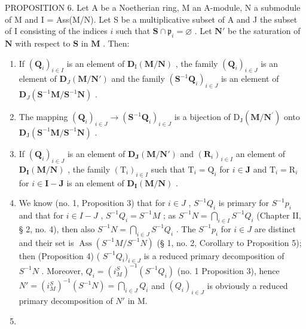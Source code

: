 PROPOSITION 6. Let A be a Noetherian ring, M an A-module, N a submodule of M and I = Ass(M/N). Let S be a multiplicative subset of A and J the subset of I consisting of the indices \(i\) such that \(\mathbf{S} \cap \mathfrak{p}_i = \varnothing\) . Let \(\mathbf{N}'\) be the saturation of \(\mathbf{N}\) with respect to \(\mathbf{S}\) in \(\mathbf{M}\) . Then:

\begin{enumerate}
\def\labelenumi{(\roman{enumi})}
\item
  If \((\mathbf{Q}_i)_{i\in I}\) is an element of \(\mathbf{D}_{\mathrm{I}}(\mathbf{M} / \mathbf{N})\) , the family \((\mathbf{Q}_i)_{i\in J}\) is an element of \(\mathbf{D}_{J}(\mathbf{M} / \mathbf{N}')\) and the family \((\mathbf{S}^{-1}\mathbf{Q}_i)_{i\in J}\) is an element of \(\mathbf{D}_{J}(\mathbf{S}^{-1}\mathbf{M} / \mathbf{S}^{-1}\mathbf{N})\) .
\item
  The mapping \((\mathbf{Q}_i)_{i\in J}\to (\mathbf{S}^{-1}\mathbf{Q}_i)_{i\in J}\) is a bijection of \(\mathrm{D}_{\mathrm{J}}(\mathbf{M} / \mathbf{N}^{\prime})\) onto \(\mathbf{D}_{\mathrm{J}}(\mathbf{S}^{-1}\mathbf{M} / \mathbf{S}^{-1}\mathbf{N})\) .
\item
  If \((\mathbf{Q}_i)_{i\in J}\) is an element of \(\mathbf{D}_{\mathbf{J}}(\mathbf{M} / \mathbf{N}')\) and \((\mathbf{R}_i)_{i\in I}\) an element of \(\mathbf{D}_{\mathbf{I}}(\mathbf{M} / \mathbf{N})\) , the family \((\mathrm{T}_i)_{i\in I}\) such that \(\mathrm{T}_i = \mathrm{Q}_i\) for \(i\in \mathbf{J}\) and \(\mathrm{T}_i = \mathrm{R}_i\) for \(i\in \mathbf{I} - \mathbf{J}\) is an element of \(\mathbf{D}_{\mathbf{I}}(\mathbf{M} / \mathbf{N})\) .
\item
  We know (no. 1, Proposition 3) that for \(i \in J\) , \(S^{-1}Q_{i}\) is primary for \(S^{-1}p_{i}\) and that for \(i \in I - J\) , \(S^{-1}Q_{i} = S^{-1}M\) ; as \(S^{-1}N = \bigcap_{i \in I} S^{-1}Q_{i}\) (Chapter II, § 2, no. 4), then also \(S^{-1}N = \bigcap_{i \in J} S^{-1}Q_{i}\) . The \(S^{-1}p_{i}\) for \(i \in J\) are distinct and their set is \(\operatorname{Ass}(S^{-1}M / S^{-1}N)\) (§ 1, no. 2, Corollary to Proposition 5); then (Proposition 4) ( \(S^{-1}Q_{i})_{i \in J}\) is a reduced primary decomposition of \(S^{-1}N\) . Moreover, \(Q_{i} = (i_{M}^{S})^{-1}(S^{-1}Q_{i})\) (no. 1 Proposition 3), hence \(N' = (i_{M}^{S})^{-1}(S^{-1}N) = \bigcap_{i \in J} Q_{i}\) and \((Q_{i})_{i \in J}\) is obviously a reduced primary decomposition of \(N'\) in M.
\item

\end{enumerate}

